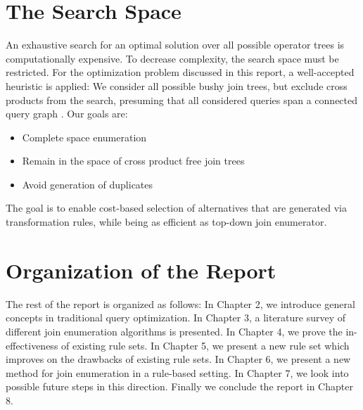 \section{The Search Space}
An exhaustive search for an optimal solution over all possible operator trees is computationally expensive. To decrease complexity, the search space must be restricted. For the optimization problem discussed in this report, a well-accepted heuristic is applied: We consider all possible bushy join trees, but exclude cross products from the search, presuming that all considered queries span a connected query graph \cite{ono1990measuring}. Our goals are:
\begin{itemize}
	\item Complete space enumeration
	\item Remain in the space of cross product free join trees
	\item Avoid generation of duplicates
\end{itemize}

The goal is to enable cost-based selection of alternatives that are generated via transformation rules, while being as efficient as top-down join enumerator.
 
\section{Organization of the Report}
The rest of the report is organized as follows:
In Chapter 2, we introduce general concepts in traditional query optimization. In Chapter 3, a literature survey of different join enumeration algorithms is presented. In Chapter 4, we prove the in-effectiveness of existing rule sets. In Chapter 5, we present a new rule set which improves on the drawbacks of existing rule sets. In Chapter 6, we present a new method for join enumeration in a rule-based setting. In Chapter 7, we look into possible future steps in this direction. Finally we conclude the report in Chapter 8.  